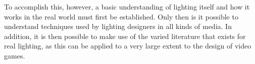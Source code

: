 To accomplish this, however, a basic understanding of lighting itself and how it works in the real world must first be established. Only then is it possible to understand techniques used by lighting designers in all kinds of media. In addition, it is then possible to make use of the varied literature that exists for real lighting, as this can be applied to a very large extent to the design of video games\cite{Niedenthal1404353}. 